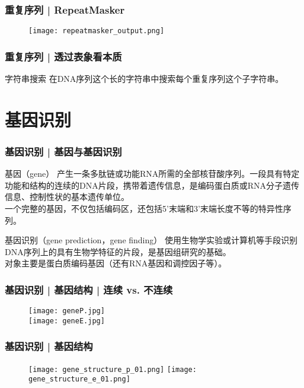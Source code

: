 \begin{frame}
  \frametitle{重复序列 | RepeatMasker}
  \begin{figure}
    \centering
    \texttt{[image: repeatmasker\_output.png]}
  \end{figure}
\end{frame}

\begin{frame}
  \frametitle{重复序列 | 透过表象看本质}
  \begin{block}{字符串搜索}
    在DNA序列这个长的字符串中搜索每个重复序列这个子字符串。
  \end{block}
\end{frame}

\section{基因识别}
\begin{frame}
  \frametitle{基因识别 | \alert{基因与基因识别}}
  \begin{block}{基因（gene）}
    产生一条多肽链或功能RNA所需的全部核苷酸序列。一段具有特定功能和结构的连续的DNA片段，携带着遗传信息，是编码蛋白质或RNA分子遗传信息、控制性状的基本遗传单位。\\
    \vspace{0.5em}
    一个完整的基因，不仅包括编码区，还包括5'末端和3'末端长度不等的特异性序列。
  \end{block}
  \pause
  \begin{block}{基因识别（gene prediction，gene finding）}
    使用生物学实验或计算机等手段识别DNA序列上的具有生物学特征的片段，是基因组研究的基础。\\
    \vspace{0.5em}
    对象主要是蛋白质编码基因（还有RNA基因和调控因子等）。
  \end{block}
\end{frame}

\begin{frame}
  \frametitle{基因识别 | 基因结构 | 连续 vs. 不连续}
  \begin{figure}
    \centering
    \texttt{[image: geneP.jpg]}
    \\
    \texttt{[image: geneE.jpg]}
  \end{figure}
\end{frame}

\begin{frame}
  \frametitle{基因识别 | 基因结构}
  \begin{figure}
    \centering
    \texttt{[image: gene\_structure\_p\_01.png]}
    \vspace{0.2cm}
    \texttt{[image: gene\_structure\_e\_01.png]}
  \end{figure}
\end{frame}

